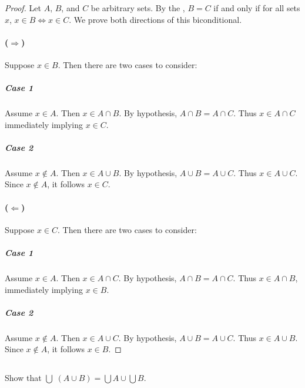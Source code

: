 \documentclass{report}
\begin{document}
  \begin{proof}
    Let $A$, $B$, and $C$ be arbitrary sets.
    By the , $B = C$ if and only if for all
      sets $x$, $x \in B \iff x \in C$.
    We prove both directions of this biconditional.

    \paragraph{($\Rightarrow$)}%

      Suppose $x \in B$.
      Then there are two cases to consider:

      \subparagraph{Case 1}%

        Assume $x \in A$.
        Then $x \in A \cap B$.
        By hypothesis, $A \cap B = A \cap C$.
        Thus $x \in A \cap C$ immediately implying $x \in C$.

      \subparagraph{Case 2}%

        Assume $x \not\in A$.
        Then $x \in A \cup B$.
        By hypothesis, $A \cup B = A \cup C$.
        Thus $x \in A \cup C$.
        Since $x \not\in A$, it follows $x \in C$.

    \paragraph{($\Leftarrow$)}%

      Suppose $x \in C$.
      Then there are two cases to consider:

      \subparagraph{Case 1}%

        Assume $x \in A$.
        Then $x \in A \cap C$.
        By hypothesis, $A \cap B = A \cap C$.
        Thus $x \in A \cap B$, immediately implying $x \in B$.

      \subparagraph{Case 2}%

        Assume $x \not\in A$.
        Then $x \in A \cup C$.
        By hypothesis, $A \cup B = A \cup C$.
        Thus $x \in A \cup B$.
        Since $x \not\in A$, it follows $x \in B$.

  \end{proof}

\subsection{}%

  Show that $\bigcup\; (A \cup B) = \bigcup A \cup \bigcup B$.
\end{document}
